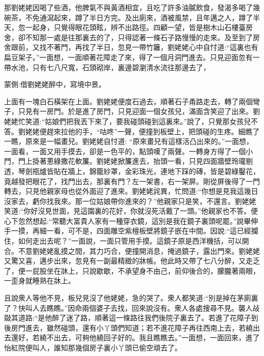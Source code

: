 \begin{parag}
    那劉姥姥因喝了些酒，他脾氣不與黃酒相宜，且吃了許多油膩飲食，發渴多喝了幾碗茶，不免通瀉起來，蹲了半日方完。及出廁來，酒被風禁，且年邁之人，蹲了半天，忽一起身，只覺得眼花頭眩，辨不出路徑。四顧一望，皆是樹木山石樓臺房舍，卻不知那一處是往那裏去的了，只得認著一條石子路慢慢的走來。及至到了房舍跟前，又找不著門，再找了半日，忽見一帶竹籬，劉姥姥心中自忖道:“這裏也有扁豆架子。”一面想，一面順著花障走了來，得了一個月洞門進去。只見迎面忽有一帶水池，只有七八尺寬，石頭砌岸，裏邊碧瀏清水流往那邊去了，\begin{note}蒙側:借劉姥姥醉中，寫境中景。\end{note}上面有一塊白石橫架在上面。劉姥姥便度石過去，順著石子甬路走去，轉了兩個彎子，只見有一房門。於是進了房門，只見迎面一個女孩兒，滿面含笑迎了出來。劉姥姥忙笑道:“姑娘們把我丟下來了，要我碰頭碰到這裏來。”說了，只覺那女孩兒不答。劉姥姥便趕來拉他的手，“咕咚”一聲，便撞到板壁上，把頭碰的生疼。細瞧了一瞧，原來是一幅畫兒。劉姥姥自忖道: “原來畫兒有這樣活凸出來的。”一面想，一面看，一面又用手摸去，卻是一色平的，點頭嘆了兩聲。一轉身方得了一個小門，門上掛著蔥綠撒花軟簾。劉姥姥掀簾進去，抬頭一看，只見四面牆壁玲瓏剔透，琴劍瓶爐皆貼在牆上，錦籠紗罩，金彩珠光，連地下踩的磚，皆是碧綠鑿花，竟越發把眼花了，找門出去，那裏有門？左一架書，右一架屏。剛從屏後得了一門轉去，只見他親家母也從外面迎了進來。劉姥姥詫異，忙問道:“你想是見我這幾日沒家去，虧你找我來。那一位姑娘帶你進來的？”他親家只是笑，不還言。劉姥姥笑道:“你好沒見世面，見這園裏的花好，你就沒死活戴了一頭。”他親家也不答。便心下忽然想起:“常聽大富貴人家有一種穿衣鏡，這別是我在鏡子裏頭呢罷。”說畢伸手一摸，再細一看，可不是，四面雕空紫檀板壁將鏡子嵌在中間。因說:“這已經攔住，如何走出去呢？”一面說，一面只管用手摸。這鏡子原是西洋機括，可以開合。不意劉姥姥亂摸之間，其力巧合，便撞開消息，掩過鏡子，露出門來。劉姥姥又驚又喜，邁步出來，忽見有一副最精緻的牀帳。他此時又帶了七八分醉，又走乏了，便一屁股坐在牀上，只說歇歇，不承望身不由己，前仰後合的，朦朧著兩眼，一歪身就睡熟在牀上。
\end{parag}


\begin{parag}
    且說衆人等他不見，板兒見沒了他姥姥，急的哭了。衆人都笑道:“別是掉在茅廁裏了？快叫人去瞧瞧。”因命兩個婆子去找，回來說沒有。衆人各處搜尋不見。襲人敁敠其道路:“是他醉了迷了路，順著這一條路往我們後院子裏去了。若進了花障子到後房門進去，雖然碰頭，還有小丫頭們知道；若不進花障子再往西南上去，若繞出去還好，若繞不出去，可夠他繞回子好的。我且瞧瞧去。”一面想，一面回來，進了怡紅院便叫人，誰知那幾個房子裏小丫頭已偷空頑去了。
\end{parag}


